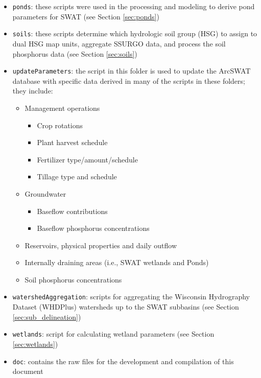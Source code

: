 \begin{itemize}
\item \texttt{ponds}: these scripts were used in the processing and modeling to derive pond parameters for SWAT (see Section \ref{sec:ponds})

\item \texttt{soils}: these scripts  determine which hydrologic soil group (HSG) to assign to dual HSG map units, aggregate SSURGO data, and process the soil phosphorus data  (see Section \ref{sec:soils})

\item \texttt{updateParameters}: the script in this folder is used to update the ArcSWAT database with specific data derived in many of the scripts in these folders; they include:
	\begin{itemize}
	\item Management operations
		\begin{itemize}
		\item Crop rotations
		\item Plant harvest schedule
		\item Fertilizer type/amount/schedule
		\item Tillage type and schedule
		\end{itemize}
	\item Groundwater
		\begin{itemize}
		\item Baseflow contributions
		\item Baseflow phosphorus concentrations 
		\end{itemize}
	\item Reservoirs, physical properties and daily outflow
	\item Internally draining areas (i.e., SWAT wetlands and Ponds)
	\item Soil phosphorus concentrations	
	\end{itemize} 

\item \texttt{watershedAggregation}: scripts for aggregating the Wisconsin Hydrography Dataset (WHDPlus) watersheds up to the SWAT subbasins (see Section \ref{sec:sub_delineation})

\item \texttt{wetlands}: script for calculating wetland parameters  (see Section \ref{sec:wetlands})

\item \texttt{doc}: contains the raw files for the development and compilation of this document

\end{itemize}
